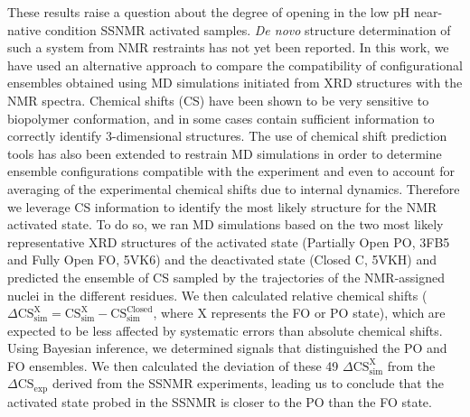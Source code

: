 \documentclass[%
 aip,
 amsmath,amssymb,
 preprint,%
]{revtex4-1}
\begin{document}
These results raise a question about the degree of opening in the low pH near-native condition SSNMR activated samples. \textit{De novo} structure determination of such a system from NMR restraints has not yet been reported. In this work, we have used an alternative approach to compare the compatibility of configurational ensembles obtained using MD simulations initiated from XRD structures with the NMR spectra. Chemical shifts (CS) have been shown to be very sensitive to biopolymer conformation, and in some cases contain sufficient information to correctly identify 3-dimensional structures.\cite{DeDios1993,Oldfield1995,Wishart2002,Shen2008,Cavalli2007,Niklasson2015,Berjanskii2015} The use of chemical shift prediction tools has also been extended to restrain MD simulations in order to determine ensemble configurations compatible with the experiment\cite{camilloni2012characterization} and even to account for averaging of the experimental chemical shifts due to internal dynamics.\cite{Robustelli2012,Markwick2010,Li2010,Li2012,Li2015} Therefore we leverage CS information to identify the most likely structure for the NMR activated state. To do so, we ran MD simulations based on the two most likely representative XRD structures of the activated state (Partially Open PO, 3FB5 and Fully Open FO, 5VK6) and the deactivated state (Closed C, 5VKH) and predicted the ensemble of CS sampled by the trajectories of the NMR-assigned nuclei in the different residues. We then calculated relative chemical shifts ($\Delta \text{CS}_\text{sim}^\text{X} = \text{CS}_\text{sim}^\text{X} - \text{CS}_\text{sim}^\text{Closed}$, where X represents the FO or PO state), which are expected to be less affected by systematic errors than absolute chemical shifts. Using Bayesian inference, we determined signals that distinguished the PO and FO ensembles. We then calculated the deviation of these 49 $\Delta \text{CS}_\text{sim}^\text{X}$ from the $\Delta \text{CS}_\text{exp}$ derived from the SSNMR experiments, leading us to conclude that the activated state probed in the SSNMR is closer to the PO than the FO state. 
\end{document}
